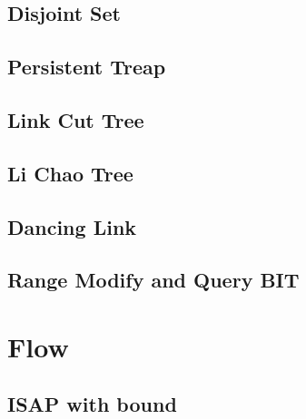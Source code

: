 \documentclass[a4paper,10pt,twocolumn,oneside]{article}
\begin{document}
\subsection{Disjoint Set}


\subsection{Persistent Treap}


%

\subsection{Link Cut Tree}


\subsection{Li Chao Tree}


%

\subsection{Dancing Link}


\subsection{Range Modify and Query BIT}


\section{Flow}
\subsection{ISAP with bound}

\end{document}
